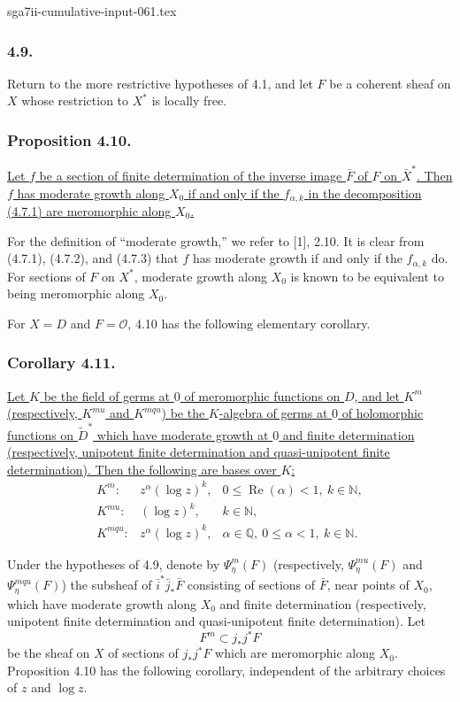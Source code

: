 \begin{filecontents*}{sga7ii-cumulative-input-061.tex}
\subsubsection*{4.9.}
Return to the more restrictive hypotheses of 4.1, and let $F$ be a
coherent sheaf on $X$ whose restriction to $X^*$ is locally free.

\subsubsection*{Proposition 4.10.}
\underline{Let $f$ be a section of finite determination of the inverse
image $\bar F$ of $F$ on $\bar X^*$.  Then $f$ has moderate growth
along $X_0$ if and only if the $f_{\alpha,k}$ in the decomposition
(4.7.1) are meromorphic along $X_0$.}

For the definition of ``moderate growth,'' we refer to [1], 2.10.  It
is clear from (4.7.1), (4.7.2), and (4.7.3) that $f$ has moderate
growth if and only if the $f_{\alpha,k}$ do.  For sections of $F$ on
$X^*$, moderate growth along $X_0$ is known to be equivalent to being
meromorphic along $X_0$.

For $X=D$ and $F=\mathcal O$, 4.10 has the following elementary
corollary.

\subsubsection*{Corollary 4.11.}
\underline{Let $K$ be the field of germs at $0$ of meromorphic
functions on $D$, and let $K^m$ (respectively, $K^{mu}$ and $K^{mqu}$)
be the $K$-algebra of germs at $0$ of holomorphic functions on
$\widetilde D^*$ which have moderate growth at $0$ and finite
determination (respectively, unipotent finite determination and
quasi-unipotent finite determination).  Then the following are bases
over $K$:}
\[
\begin{array}{lll}
K^m:&z^\alpha(\log z)^k,
  &0\leq\operatorname{Re}(\alpha)<1,\ k\in\mathbb N,\\[2pt]
K^{mu}:&(\log z)^k,&k\in\mathbb N,\\[2pt]
K^{mqu}:&z^\alpha(\log z)^k,
  &\alpha\in\mathbb Q,\ 0\leq\alpha<1,\ k\in\mathbb N.
\end{array}
\]

Under the hypotheses of 4.9, denote by $\Psi_\eta^m(F)$
(respectively, $\Psi_\eta^{mu}(F)$ and $\Psi_\eta^{mqu}(F)$) the
subsheaf of $\bar i^*\bar j_*\bar F$ consisting of sections of
$\bar F$, near points of $X_0$, which have moderate growth along
$X_0$ and finite determination (respectively, unipotent finite
determination and quasi-unipotent finite determination).  Let
\[
F^m\subset j_*j^*F
\]
be the sheaf on $X$ of sections of $j_*j^*F$ which are meromorphic
along $X_0$.  Proposition 4.10 has the following corollary, independent
of the arbitrary choices of $z$ and $\log z$.


\end{filecontents*}
